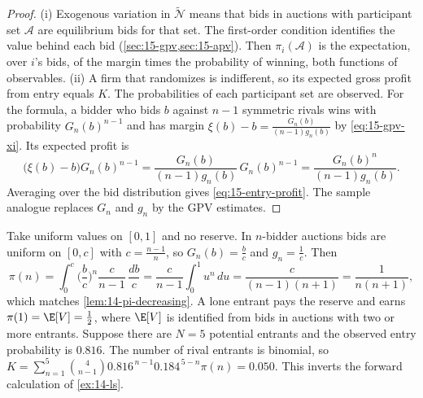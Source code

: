 \begin{proof}
(i) Exogenous variation in $\tilde{\mathcal N}$ means that bids in auctions with participant set
$\mathcal A$ are equilibrium bids for that set. The first-order condition identifies the value behind
each bid (\cref{sec:15-gpv,sec:15-apv}). Then $\pi_i(\mathcal A)$ is the expectation, over $i$'s bids, of
the margin times the probability of winning, both functions of observables. (ii) A firm that
randomizes is indifferent, so its expected gross profit from entry equals $K$. The probabilities of
each participant set are observed. For the formula, a bidder who bids $b$ against $n-1$ symmetric
rivals wins with probability $G_n(b)^{n-1}$ and has margin
$\xi(b)-b=\frac{G_n(b)}{(n-1)g_n(b)}$ by \eqref{eq:15-gpv-xi}. Its expected profit is
\[
\big(\xi(b)-b\big)G_n(b)^{n-1}=\frac{G_n(b)}{(n-1)g_n(b)}\,G_n(b)^{n-1}=\frac{G_n(b)^n}{(n-1)g_n(b)} .
\]
Averaging over the bid distribution gives \eqref{eq:15-entry-profit}. The sample analogue replaces $G_n$
and $g_n$ by the GPV estimates.
\end{proof}

\begin{example}\label{ex:15-entry-uniform}
Take uniform values on $[0,1]$ and no reserve. In $n$-bidder auctions bids are uniform on
$[0,c]$ with $c=\frac{n-1}{n}$, so $G_n(b)=\frac{b}{c}$ and $g_n=\frac{1}{c}$. Then
\[
\pi(n)=\int_0^c\Big(\frac{b}{c}\Big)^n\frac{c}{n-1}\,\frac{db}{c}=\frac{c}{n-1}\int_0^1u^n\,du=\frac{c}{(n-1)(n+1)}=\frac{1}{n(n+1)},
\]
which matches \cref{lem:14-pi-decreasing}. A lone entrant pays the reserve and earns
$\pi(1)=\E[V]=\frac{1}{2}$, where $\E[V]$ is identified from bids in auctions with two or more entrants.
Suppose there are $N=5$ potential entrants and the observed entry probability is $0.816$. The number of
rival entrants is binomial, so
$K=\sum_{n=1}^5\binom{4}{n-1}0.816^{\,n-1}0.184^{\,5-n}\pi(n)=0.050$. This inverts the forward
calculation of \cref{ex:14-ls}.
\end{example}

